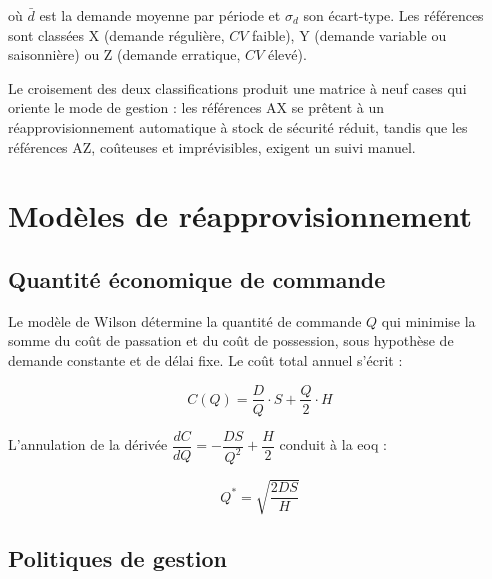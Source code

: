 où $\bar{d}$ est la demande moyenne par période et $\sigma_{d}$ son écart-type.
Les références sont classées X (demande régulière, $CV$ faible), Y (demande
variable ou saisonnière) ou Z (demande erratique, $CV$ élevé).

Le croisement des deux classifications produit une matrice à neuf cases qui
oriente le mode de gestion : les références AX se prêtent à un
réapprovisionnement automatique à stock de sécurité réduit, tandis que les
références AZ, coûteuses et imprévisibles, exigent un suivi manuel.


\section{Modèles de réapprovisionnement}
\label{sec:modeles_appro}

\subsection{Quantité économique de commande}

Le modèle de Wilson détermine la quantité de commande $Q$ qui minimise la somme
du coût de passation et du coût de possession, sous hypothèse de demande
constante et de délai fixe. Le coût total annuel s'écrit :

\begin{equation}
  C(Q) = \frac{D}{Q} \cdot S + \frac{Q}{2} \cdot H
  \label{eq:cout_total}
\end{equation}

L'annulation de la dérivée $\dfrac{dC}{dQ} = -\dfrac{DS}{Q^{2}} + \dfrac{H}{2}$
conduit à la \gls{eoq} :

\begin{equation}
  Q^{*} = \sqrt{\frac{2DS}{H}}
  \label{eq:eoq}
\end{equation}


\subsection{Politiques de gestion}


